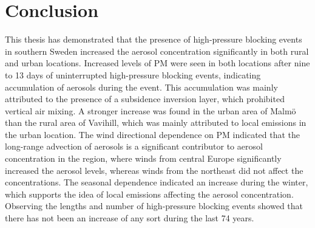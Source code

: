 \section{Conclusion}
This thesis has demonstrated that the presence of high-pressure blocking events in southern Sweden increased the aerosol concentration significantly in both rural and urban locations. Increased levels of PM were seen in both locations after nine to 13 days of uninterrupted high-pressure blocking events, indicating accumulation of aerosols during the event. This accumulation was mainly attributed to the presence of a subsidence inversion layer, which prohibited vertical air mixing. A stronger increase was found in the urban area of Malmö than the rural area of Vavihill, which was mainly attributed to local emissions in the urban location. The wind directional dependence on PM indicated that the long-range advection of aerosols is a significant contributor to aerosol concentration in the region, where winds from central Europe significantly increased the aerosol levels, whereas winds from the northeast did not affect the concentrations. The seasonal dependence indicated an increase during the winter, which supports the idea of local emissions affecting the aerosol concentration. Observing the lengths and number of high-pressure blocking events showed that there has not been an increase of any sort during the last 74 years.

